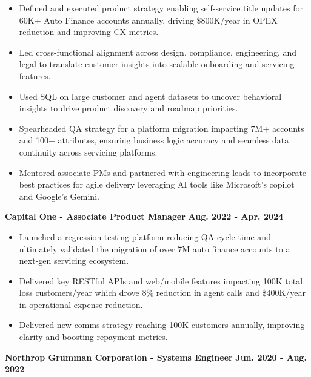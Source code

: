\documentclass[a4paper,8pt]{article}
\begin{document}
\begin{itemize}

    \item Defined and executed product strategy enabling self-service title updates for 60K+ Auto Finance accounts annually, driving \$800K/year in OPEX reduction and improving CX metrics.
    
    \item Led cross-functional alignment across design, compliance, engineering, and legal to translate customer insights into scalable onboarding and servicing features.
    
    \item Used SQL on large customer and agent datasets to uncover behavioral insights to drive product discovery and roadmap priorities.
   
    \item Spearheaded QA strategy for a platform migration impacting 7M+ accounts and 100+ attributes, ensuring business logic accuracy and seamless data continuity across servicing platforms.
   
    \item Mentored associate PMs and partnered with engineering leads to incorporate best practices for agile delivery leveraging AI tools like Microsoft's copilot and Google's Gemini.
   
\end{itemize}

\noindent \normalsize\textbf{Capital One - Associate Product Manager} \hspace*{\fill}\textbf{ Aug. 2022 - Apr. 2024}

\begin{itemize}
    \item Launched a regression testing platform reducing QA cycle time and ultimately validated the migration of over 7M auto finance accounts to a next-gen servicing ecosystem.
     \item Delivered key RESTful APIs and web/mobile features impacting 100K total loss customers/year which drove 8\% reduction in agent calls and \$400K/year in operational expense reduction.
    \item Delivered new comms strategy reaching 100K customers annually, improving clarity and boosting repayment metrics.
    \end{itemize}



\noindent \normalsize\textbf{Northrop Grumman Corporation - Systems Engineer} \hspace*{\fill} \textbf{Jun. 2020 - Aug. 2022}
\end{document}
